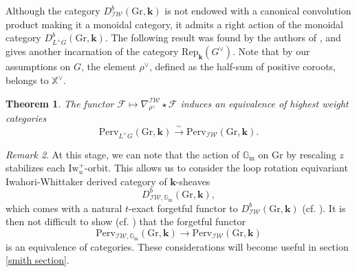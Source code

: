 \documentclass[11pt]{amsart}
\theoremstyle{plain}
\newtheorem{thm}{Theorem}[section]
\theoremstyle{remark}
\newtheorem{rem}[thm]{Remark}
\numberwithin{equation}{section}
\begin{document}
	Although the category $D^b_{\mathcal{IW}}(\mathrm{Gr},\mathbf{k})$ is not endowed with a canonical convolution product making it a monoidal category, it admits a right action of the monoidal category $D^b_{L^+G}(\mathrm{Gr},\mathbf{k})$. The following result was found by the authors of \cite{JEP_2019__6__707_0}, and gives another incarnation of the category $\mathrm{Rep}_\mathbf{k}(G^\vee)$. Note that by our assumptions on $G$, the element $\rho^\vee$, defined as the half-sum of positive coroots, belongs to $\mathbb{X}^\vee$.
	\begin{thm}\label{IW equivalence}
		The functor  $\mathcal{F}\mapsto \nabla^{\mathcal{IW}}_{\rho^\vee}\star \mathcal{F}$ induces an equivalence of highest weight categories 
		$$\mathrm{Perv}_{L^+G}(\mathrm{Gr},\mathbf{k})\xrightarrow{\sim}\mathrm{Perv}_{\mathcal{IW}}(\mathrm{Gr},\mathbf{k}).$$
	\end{thm}
	\begin{rem}\label{rem1}
		At this stage, we can note that the action of $\mathbb{G}_\mathrm{m}$ on $\mathrm{Gr}$ by rescaling $z$ stabilizes each $\mathrm{Iw}_u^+$-orbit. This allows us to consider the loop rotation equivariant Iwahori-Whittaker derived category of $\mathbf{k}$-sheaves
		$$D^b_{\mathcal{IW},\mathbb{G}_\mathrm{m}}(\mathrm{Gr},\mathbf{k}),$$
		which comes with a natural $t$-exact forgetful functor to $D^b_{\mathcal{IW}}(\mathrm{Gr},\mathbf{k})$ (cf. \cite[§5.2]{riche2020smithtreumann}). It is then not difficult to show (cf. \cite[Lemma 5.2]{riche2020smithtreumann}) that the forgetful functor 
		\begin{equation}\label{eq3}
			\mathrm{Perv}_{\mathcal{IW},\mathbb{G}_\mathrm{m}}(\mathrm{Gr},\mathbf{k})\to \mathrm{Perv}_{\mathcal{IW}}(\mathrm{Gr},\mathbf{k})
		\end{equation}
		is an equivalence of categories. These considerations will become useful in section \ref{smith section}.
	\end{rem}
\end{document}
